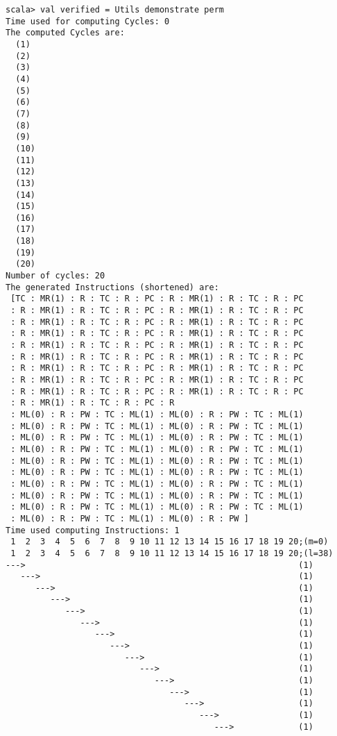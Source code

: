 \begin{lstlisting}
scala> val verified = Utils demonstrate perm
Time used for computing Cycles: 0
The computed Cycles are: 
  (1)
  (2)
  (3)
  (4)
  (5)
  (6)
  (7)
  (8)
  (9)
  (10)
  (11)
  (12)
  (13)
  (14)
  (15)
  (16)
  (17)
  (18)
  (19)
  (20)
Number of cycles: 20
The generated Instructions (shortened) are: 
 [TC : MR(1) : R : TC : R : PC : R : MR(1) : R : TC : R : PC
 : R : MR(1) : R : TC : R : PC : R : MR(1) : R : TC : R : PC
 : R : MR(1) : R : TC : R : PC : R : MR(1) : R : TC : R : PC
 : R : MR(1) : R : TC : R : PC : R : MR(1) : R : TC : R : PC
 : R : MR(1) : R : TC : R : PC : R : MR(1) : R : TC : R : PC
 : R : MR(1) : R : TC : R : PC : R : MR(1) : R : TC : R : PC
 : R : MR(1) : R : TC : R : PC : R : MR(1) : R : TC : R : PC
 : R : MR(1) : R : TC : R : PC : R : MR(1) : R : TC : R : PC
 : R : MR(1) : R : TC : R : PC : R : MR(1) : R : TC : R : PC
 : R : MR(1) : R : TC : R : PC : R
 : ML(0) : R : PW : TC : ML(1) : ML(0) : R : PW : TC : ML(1) 
 : ML(0) : R : PW : TC : ML(1) : ML(0) : R : PW : TC : ML(1)
 : ML(0) : R : PW : TC : ML(1) : ML(0) : R : PW : TC : ML(1)
 : ML(0) : R : PW : TC : ML(1) : ML(0) : R : PW : TC : ML(1)
 : ML(0) : R : PW : TC : ML(1) : ML(0) : R : PW : TC : ML(1)
 : ML(0) : R : PW : TC : ML(1) : ML(0) : R : PW : TC : ML(1)
 : ML(0) : R : PW : TC : ML(1) : ML(0) : R : PW : TC : ML(1)
 : ML(0) : R : PW : TC : ML(1) : ML(0) : R : PW : TC : ML(1)
 : ML(0) : R : PW : TC : ML(1) : ML(0) : R : PW : TC : ML(1)
 : ML(0) : R : PW : TC : ML(1) : ML(0) : R : PW ] 
Time used computing Instructions: 1
 1  2  3  4  5  6  7  8  9 10 11 12 13 14 15 16 17 18 19 20;(m=0)
 1  2  3  4  5  6  7  8  9 10 11 12 13 14 15 16 17 18 19 20;(l=38)
--->                                                       (1)
   --->                                                    (1)
      --->                                                 (1)
         --->                                              (1)
            --->                                           (1)
               --->                                        (1)
                  --->                                     (1)
                     --->                                  (1)
                        --->                               (1)
                           --->                            (1)
                              --->                         (1)
                                 --->                      (1)
                                    --->                   (1)
                                       --->                (1)
                                          --->             (1)

\end{lstlisting}
